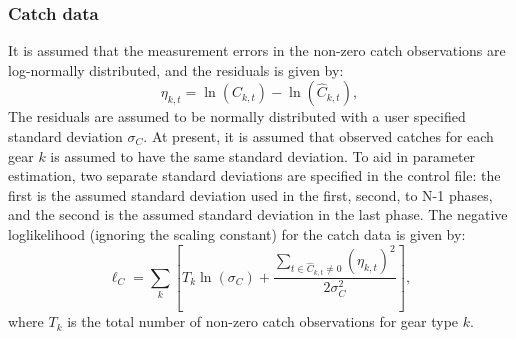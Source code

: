 \subsubsection{Catch data}
It is assumed that the measurement errors in the non-zero catch observations are log-normally distributed, and the residuals is given by:
\begin{equation}\label{eq2}
\eta_{k,t}=\ln(C_{k,t}) -  \ln(\hat{C}_{k,t}),
\end{equation}
The residuals are assumed to be normally distributed with a user specified standard deviation $\sigma_{C}$.  At present, it is assumed that observed catches for each gear $k$ is assumed to have the same standard deviation.  To aid in parameter estimation, two separate standard deviations are specified in the control file: the first is the assumed standard deviation used in the first, second, to N-1 phases, and the second is the assumed standard deviation in the last phase.  The negative loglikelihood (ignoring the scaling constant) for the catch data is given by:
\begin{equation}\label{eq3}
\ell_C = \sum_k\left[  T_k\ln(\sigma_C)+\dfrac{\sum_{t \in \hat{C}_{k,t}\neq 0}(\eta_{k,t})^2}{2\sigma_C^2}\right],
\end{equation}
where $T_k$ is the total number of non-zero catch observations for gear type $k$.


